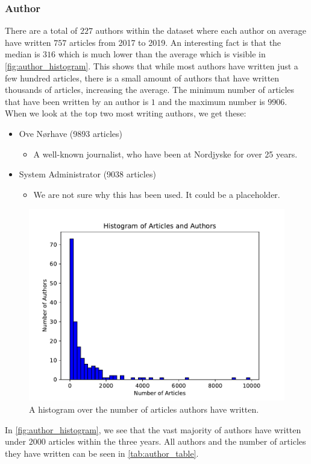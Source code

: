 \subsubsection{Author}\label{subsec:appendix_author}
There are a total of $227$ authors within the dataset where each author on average have written $757$ articles from 2017 to 2019.
An interesting fact is that the median is $316$ which is much lower than the average which is visible in \autoref{fig:author_histogram}.
This shows that while most authors have written just a few hundred articles, there is a small amount of authors that have written thousands of articles, increasing the average.
The minimum number of articles that have been written by an author is $1$ and the maximum number is $9906$.
When we look at the top two most writing authors, we get these:
\begin{itemize}
	\item Ove Nørhave (9893 articles)
	\begin{itemize}
		\item A well-known journalist, who have been at Nordjyske for over 25 years.
	\end{itemize}
	\item System Administrator (9038 articles)
	\begin{itemize}
		\item We are not sure why this has been used. It could be a placeholder.
	\end{itemize}
\end{itemize}

\begin{figure}
	\centering
	\includegraphics[width=.55\linewidth]{figures/author_hist_plot.pdf}
	\caption{A histogram over the number of articles authors have written.}
	\label{fig:author_histogram}
\end{figure}
In \autoref{fig:author_histogram}, we see that the vast majority of authors have written under $2000$ articles within the three years. 
All authors and the number of articles they have written can be seen in \autoref{tab:author_table}.

